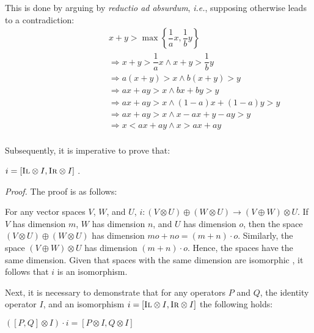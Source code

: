 This is done by arguing by \textit{reductio ad absurdum}, \textit{i.e.}, supposing otherwise leads to a contradiction:
\begin{equation} 
\begin{split} 
    \hspace{90pt}&
     x + y  >  \max \left\{   \dfrac{1}{a}x  ,   \dfrac{1}{b} y   \right\} \\
    & \Rightarrow  x + y > \dfrac{1}{a}x  \wedge x + y > \dfrac{1}{b}y \\
    & \Rightarrow  a (x + y) > x  \wedge b (x + y)> y \\
    & \Rightarrow  a x + a y > x  \wedge b x + by > y \\
    & \Rightarrow  a x + a y > x  \wedge (1-a) x + (1-a)y > y\\
    & \Rightarrow  a x + a y > x  \wedge x-ax + y -ay > y\\
    & \Rightarrow  x < a x + a y   \wedge x > a x + a y  \\
\end{split}
\end{equation}

\vspace{10pt}

Subsequently, it is imperative to prove that:
\begin{lemma}\label{lemiso}
  $ i= [\textsc{Il} \otimes I, \textsc{Ir} \otimes I ]$ .
\end{lemma}

\textit{Proof.} \quad The proof is as follows:

For any vector spaces $V$, $W$, and $U$, $i: (V \otimes U) \oplus (W \otimes U) \xrightarrow{} (V  \oplus W) \otimes U $. If $V$ has dimension $m$, $W$ has dimension $n$, and $U$ has dimension $o$, then the space $(V \otimes U) \oplus (W \otimes U) $ has dimension $mo+no=(m+n)\cdot o$. Similarly, the space $(V\oplus W) \otimes U$ has dimension $(m+n)\cdot o$. Hence, the spaces have the same dimension. Given that spaces with the same dimension are isomorphic \cite{hefferon2006linear}, it follows that $i$ is an isomorphism.

\vspace{10pt}

Next, it is necessary to demonstrate that for any operators $P$ and $Q$, the identity operator $I$, and an isomorphism $i=[\textsc{Il} \otimes I, \textsc{Ir} \otimes I ]$ the following holds:

\begin{lemma}\label{lem2}
  $( [P,Q] \otimes I) \cdot  i  = [P \otimes I, Q \otimes I]$
\end{lemma}

